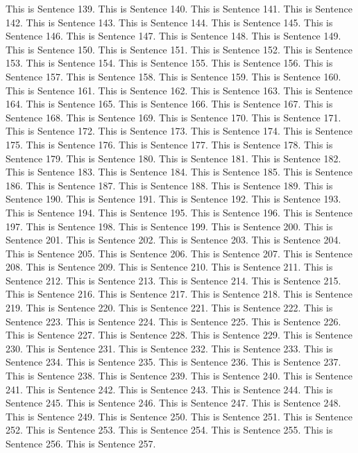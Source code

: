 \documentclass{article}
\begin{document}
This is Sentence 139.
This is Sentence 140.
This is Sentence 141.
This is Sentence 142.
This is Sentence 143.
This is Sentence 144.
This is Sentence 145.
This is Sentence 146.
This is Sentence 147.
This is Sentence 148.
This is Sentence 149.
This is Sentence 150.
This is Sentence 151.
This is Sentence 152.
This is Sentence 153.
This is Sentence 154.
This is Sentence 155.
This is Sentence 156.
This is Sentence 157.
This is Sentence 158.
This is Sentence 159.
This is Sentence 160.
This is Sentence 161.
This is Sentence 162.
This is Sentence 163.
This is Sentence 164.
This is Sentence 165.
This is Sentence 166.
This is Sentence 167.
This is Sentence 168.
This is Sentence 169.
This is Sentence 170.
This is Sentence 171.
This is Sentence 172.
This is Sentence 173.
This is Sentence 174.
This is Sentence 175.
This is Sentence 176.
This is Sentence 177.
This is Sentence 178.
This is Sentence 179.
This is Sentence 180.
This is Sentence 181.
This is Sentence 182.
This is Sentence 183.
This is Sentence 184.
This is Sentence 185.
This is Sentence 186.
This is Sentence 187.
This is Sentence 188.
This is Sentence 189.
This is Sentence 190.
This is Sentence 191.
This is Sentence 192.
This is Sentence 193.
This is Sentence 194.
This is Sentence 195.
This is Sentence 196.
This is Sentence 197.
This is Sentence 198.
This is Sentence 199.
This is Sentence 200.
This is Sentence 201.
This is Sentence 202.
This is Sentence 203.
This is Sentence 204.
This is Sentence 205.
This is Sentence 206.
This is Sentence 207.
This is Sentence 208.
This is Sentence 209.
This is Sentence 210.
This is Sentence 211.
This is Sentence 212.
This is Sentence 213.
This is Sentence 214.
This is Sentence 215.
This is Sentence 216.
This is Sentence 217.
This is Sentence 218.
This is Sentence 219.
This is Sentence 220.
This is Sentence 221.
This is Sentence 222.
This is Sentence 223.
This is Sentence 224.
This is Sentence 225.
This is Sentence 226.
This is Sentence 227.
This is Sentence 228.
This is Sentence 229.
This is Sentence 230.
This is Sentence 231.
This is Sentence 232.
This is Sentence 233.
This is Sentence 234.
This is Sentence 235.
This is Sentence 236.
This is Sentence 237.
This is Sentence 238.
This is Sentence 239.
This is Sentence 240.
This is Sentence 241.
This is Sentence 242.
This is Sentence 243.
This is Sentence 244.
This is Sentence 245.
This is Sentence 246.
This is Sentence 247.
This is Sentence 248.
This is Sentence 249.
This is Sentence 250.
This is Sentence 251.
This is Sentence 252.
This is Sentence 253.
This is Sentence 254.
This is Sentence 255.
This is Sentence 256.
This is Sentence 257.
\end{document}
